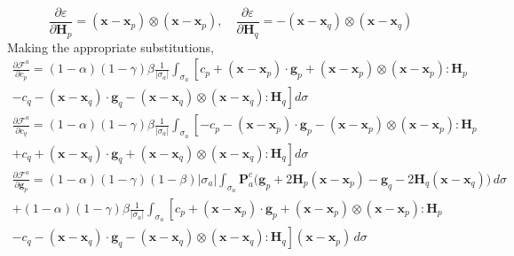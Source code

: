 \documentclass[11pt]{article} %
\begin{document}
\begin{equation}
	\frac{\partial \varepsilon}{\partial \mathbf{H}_p} = (\mathbf{x} - \mathbf{x}_p) \otimes (\mathbf{x} - \mathbf{x}_p), \quad \frac{\partial \varepsilon}{\partial \mathbf{H}_q} = -(\mathbf{x} - \mathbf{x}_q) \otimes (\mathbf{x} - \mathbf{x}_q)
\end{equation}
Making the appropriate substitutions,
\begin{eqnarray}
	\frac{\partial \mathcal{F}^a}{\partial c_p} = (1-\alpha) (1-\gamma) \beta \frac{1}{| \sigma_a |} \int_{\sigma_a} \left[ c_p + (\mathbf{x} - \mathbf{x}_p) \cdot \mathbf{g}_p + (\mathbf{x} - \mathbf{x}_p) \otimes (\mathbf{x} - \mathbf{x}_p) \colon \mathbf{H}_p \right. \nonumber \\ \left. - c_q - (\mathbf{x} - \mathbf{x}_q) \cdot \mathbf{g}_q - (\mathbf{x} - \mathbf{x}_q) \otimes (\mathbf{x} - \mathbf{x}_q) \colon \mathbf{H}_q \right] d \sigma
\end{eqnarray}
\begin{eqnarray}
	\frac{\partial \mathcal{F}^a}{\partial c_q} = (1-\alpha) (1-\gamma) \beta \frac{1}{| \sigma_a |} \int_{\sigma_a} \left[ - c_p - (\mathbf{x} - \mathbf{x}_p) \cdot \mathbf{g}_p - (\mathbf{x} - \mathbf{x}_p) \otimes (\mathbf{x} - \mathbf{x}_p) \colon \mathbf{H}_p \right. \nonumber \\ \left. + c_q + (\mathbf{x} - \mathbf{x}_q) \cdot \mathbf{g}_q + (\mathbf{x} - \mathbf{x}_q) \otimes (\mathbf{x} - \mathbf{x}_q) \colon \mathbf{H}_q \right] d \sigma
\end{eqnarray}
\begin{eqnarray}
	\frac{\partial \mathcal{F}^a}{\partial \mathbf{g}_p} = (1-\alpha)(1-\gamma)(1-\beta) | \sigma_a | \int_{\sigma_a} \mathbf{P}^c_a \bigg( \mathbf{g}_p + 2 \mathbf{H}_p (\mathbf{x} - \mathbf{x}_p) - \mathbf{g}_q - 2 \mathbf{H}_q (\mathbf{x} - \mathbf{x}_q) \bigg) \, d \sigma \nonumber \\ + (1-\alpha) (1-\gamma) \beta \frac{1}{| \sigma_a |} \int_{\sigma_a} \left[ c_p + (\mathbf{x} - \mathbf{x}_p) \cdot \mathbf{g}_p + (\mathbf{x} - \mathbf{x}_p) \otimes (\mathbf{x} - \mathbf{x}_p) \colon \mathbf{H}_p \right. \nonumber \\ \left. - c_q - (\mathbf{x} - \mathbf{x}_q) \cdot \mathbf{g}_q - (\mathbf{x} - \mathbf{x}_q) \otimes (\mathbf{x} - \mathbf{x}_q) \colon \mathbf{H}_q \right] (\mathbf{x} - \mathbf{x}_p) \, d \sigma
\end{eqnarray}
\end{document}

